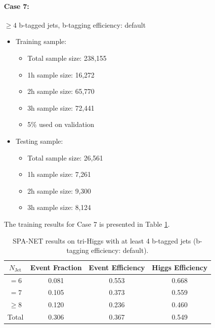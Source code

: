 \documentclass[12pt]{article}
\begin{document}
		\paragraph{Case 7:} $\ge 4$ b-tagged jets, b-tagging efficiency: default 
		\begin{itemize}
			\item Training sample:
			\begin{itemize}
				\item Total sample size: 238,155
				\item 1h sample size: 16,272
				\item 2h sample size: 65,770
				\item 3h sample size: 72,441
				\item 5\% used on validation
			\end{itemize}
			\item Testing sample: 
				\begin{itemize}
					\item Total sample size: 26,561
					\item 1h sample size: 7,261
					\item 2h sample size: 9,300
					\item 3h sample size: 8,124
				\end{itemize}
		\end{itemize}
		The training results for Case 7 is presented in Table \ref{tab:SPANet_triHiggs_4btag_default}.
		\begin{table}[htpb]
			\centering
			\caption{SPA-NET results on tri-Higgs with at least 4 b-tagged jets (b-tagging efficiency: default).}
			\label{tab:SPANet_triHiggs_4btag_default}
			\begin{tabular}{c|c|cc}
				$N_\text{Jet}$ & Event Fraction & Event Efficiency & Higgs Efficiency \\
				\hline
				$=6$	  &   0.081             &    0.553              &    0.668             \\
				$=7$	  &   0.105             &    0.373              &    0.559             \\
				$\ge 8$	  &   0.120             &    0.236              &    0.460             \\
				Total	  &   0.306             &    0.367              &    0.549             \\
			\end{tabular}
		\end{table}
\end{document}
